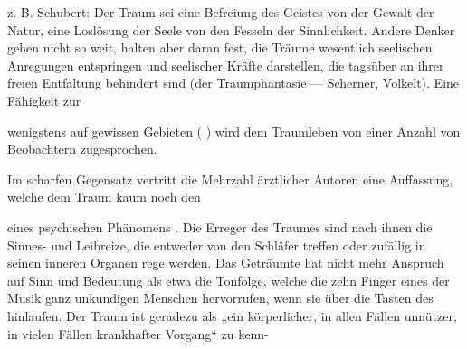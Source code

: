 \documentclass{article}
\begin{document}
                z. B. Schubert:
               Der Traum sei eine Befreiung des Geistes von der Gewalt der 
     Natur, eine Loslösung der Seele von den Fesseln der Sinnlichkeit. Andere
               Denker gehen nicht so weit, halten aber daran fest, 
     die Träume wesentlich seelischen Anregungen entspringen und 
     seelischer Kräfte darstellen, die tagsüber an ihrer freien
               Entfaltung behindert sind (der
               Traumphantasie — Scherner, Volkelt). Eine Fähigkeit zur
               
     wenigstens auf gewissen Gebieten (
    ) wird dem Traumleben von einer 
     Anzahl von Beobachtern zugesprochen.
        \pend
    
            
        \pstart
        Im scharfen Gegensatz 
     vertritt die Mehrzahl ärztlicher Autoren eine Auffassung, welche dem Traum kaum noch den 
    
                eines psychischen Phänomens 
    . Die Erreger des Traumes sind nach ihnen 
     die Sinnes- und Leibreize, die entweder von 
     den Schläfer treffen oder zufällig in seinen inneren Organen rege werden.
               Das Geträumte hat nicht mehr Anspruch auf Sinn und Bedeutung als etwa die
               Tonfolge, welche die zehn Finger eines der Musik
               ganz unkundigen Menschen hervorrufen, wenn sie über die Tasten des 
     hinlaufen. Der Traum ist geradezu als „ein körperlicher, in allen Fällen
                  unnützer, in vielen Fällen krankhafter Vorgang“ zu kenn-
        \pend
    
\end{document}
